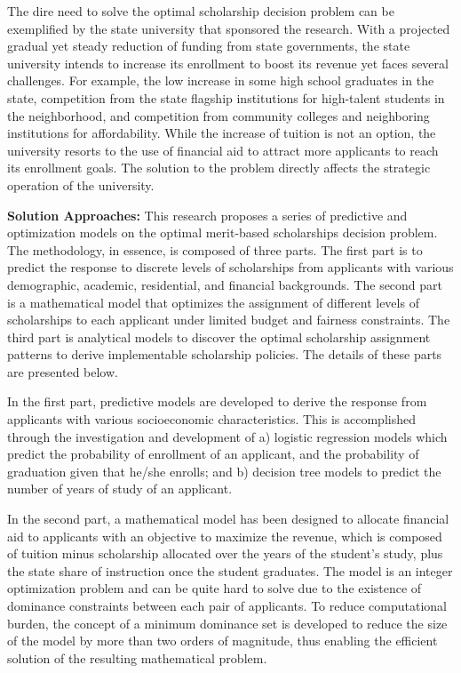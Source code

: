 \documentclass[12pt,english]{report}
\begin{document}
The dire need to solve the optimal scholarship decision problem can be
exemplified by the state university that sponsored the research.  
With a projected gradual yet steady reduction of funding from state governments, the state university intends to increase its enrollment to boost its revenue yet faces several challenges.  For example, the low increase in some high school graduates in the state, competition from the state flagship institutions for high-talent students in the neighborhood, and competition from community colleges and neighboring institutions for affordability.  While the increase of tuition is not an option,  the university resorts to the use of financial aid to attract more applicants to reach its enrollment goals. The
solution to the problem directly affects the strategic operation of the
university.

\vspace*{.15in} 
\noindent \textbf{Solution Approaches:} 
This research proposes a series of predictive and optimization
models on the optimal merit-based scholarships decision problem.  The
methodology, in essence, is composed of three parts. The first part is to
predict the response to discrete levels of scholarships from applicants with various demographic, academic, residential, and financial backgrounds. The second part is a mathematical model that optimizes the assignment of different levels of scholarships to each applicant under limited budget and fairness
constraints.  The third part is analytical models to discover the optimal
scholarship assignment patterns to derive implementable scholarship policies. The details of these parts are presented below.

In the first part, predictive models are developed to derive the response from applicants with various socioeconomic characteristics. This is accomplished through the investigation and development of a) logistic regression models which predict the probability of enrollment of an applicant, and the probability of graduation given that he/she enrolls; and b) decision tree models to predict the number of years of study of an applicant.

In the second part, a mathematical model has been designed to allocate financial aid to applicants with an objective to maximize the revenue, which is composed of tuition minus scholarship allocated over the years of the student's study, plus the state share of instruction once the student graduates.  The model is an integer optimization problem and can be quite hard to solve due to the existence of dominance constraints between each pair of applicants. To reduce computational
burden, the concept of a minimum dominance set is developed to reduce the size of the model by more than two orders of magnitude, thus enabling the efficient solution of the resulting mathematical problem.
\end{document}
